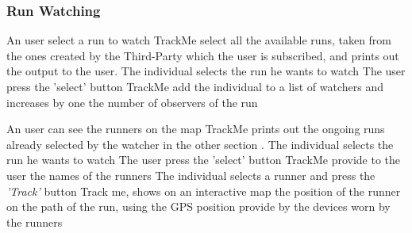 \documentclass[a4paper]{article}
\begin{document}
        \subsubsection{Run Watching }
        \begin{usecase}{An user select a run to watch}
              {TrackMe select all the available runs, taken from the ones created by the Third-Party which the user is subscribed, and prints out the output to the user.}
              {The individual selects the run he wants to watch}
              {The user press the {'select'} button }
              {TrackMe add the individual to a list of watchers and increases by one the number of observers of the run}
           
        \end{usecase}
        
        
        
        
        
        
        \begin{usecase}{An user can see the runners on the map}
              {TrackMe prints out the ongoing runs already selected by the watcher in the other section .}
              {The individual selects the run he wants to watch}
              {The user press the {'select'} button }
              {TrackMe provide to the user the names of the runners}
              {The individual selects a runner and press the \textit{'Track'} button}
              {Track me, shows on an interactive map the position of the runner on the path of the run, using the GPS position provide by the devices worn by the runners}
           
        \end{usecase}
        
\end{document}
